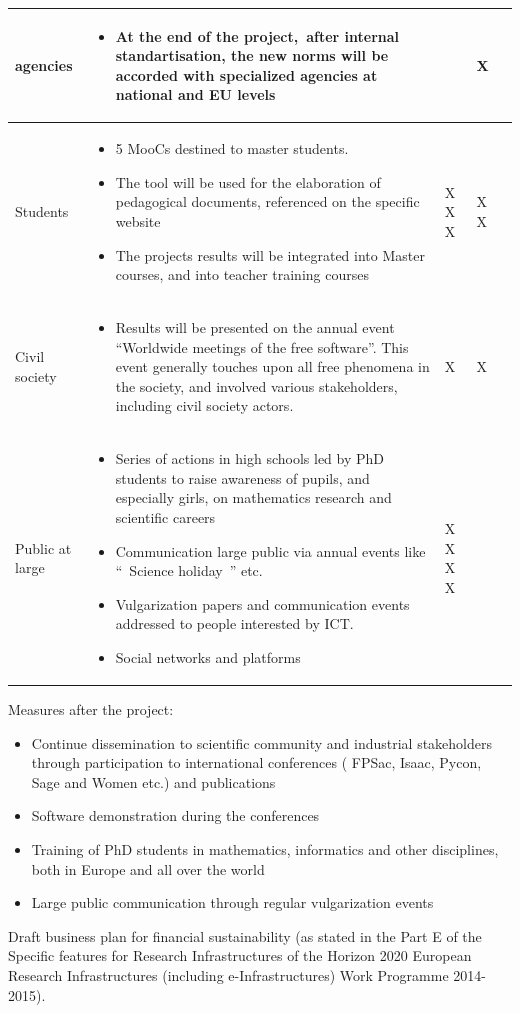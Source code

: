 \begin{flushleft}
\begin{supertabular}{|m{2.7949998cm}|m{10.711cm}|m{1.0489999cm}|m{1.301cm}|m{1.163cm}|}
agencies  &
\begin{itemize}
\item At the end of the project,~after internal standartisation, the new
norms will be accorded with specialized agencies at national and EU
levels\end{itemize}
 &
 &
X &
\\\hline
Students &
\begin{itemize}
\item 5 MooCs destined to master students.\item The tool will be used
for the elaboration of pedagogical documents, referenced on the
specific website\item The projects results will be integrated into
Master courses, and into teacher training courses\end{itemize}
 &
X
X
X
 &
X
X &
\\\hline
Civil society &
\begin{itemize}
\item Results will be presented on the annual event “Worldwide meetings
of the free software”. This event generally touches upon all free
phenomena in the society, and involved various stakeholders, including
civil society actors.\end{itemize}
 &
X &
X &
\\\hline
Public at large &
\begin{itemize}
\item Series of actions in high schools led by PhD students to raise
awareness of pupils, and especially girls, on mathematics research and
scientific careers\item Communication large public via annual events
like ``~Science holiday~'' etc.\item Vulgarization papers and
communication events addressed to people interested by ICT. \item Social
networks and platforms\end{itemize}
 &
X
X
X
X &
 &
\\\hline
\end{supertabular}
\end{flushleft}
Measures after the project:

\begin{itemize}
\item Continue dissemination to scientific community and industrial
stakeholders through participation to international conferences (
FPSac, Isaac, Pycon, Sage and Women etc.) and publications
\item Software demonstration during the conferences
\item Training of  PhD students in mathematics, informatics and other
disciplines, both in Europe and all over the world
\item Large public communication  through regular vulgarization events
\end{itemize}
Draft business plan for financial sustainability (as stated in the Part
E of the Specific features for Research Infrastructures of the Horizon
2020 European Research Infrastructures (including e-Infrastructures)
Work Programme 2014-2015).

